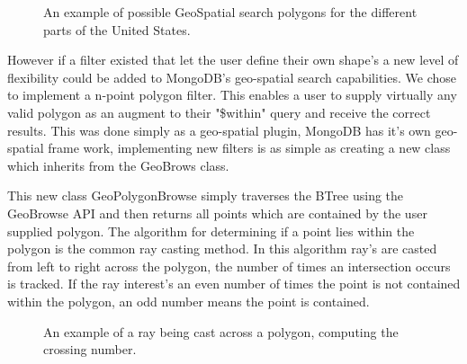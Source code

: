 \documentclass{../dependencies/acm_proc_article-sp}
\begin{document}
\begin{figure}[htb]
\centering
\setlength\fboxsep{0.5pt}
\setlength\fboxrule{0.5pt}
\caption{An example of possible GeoSpatial search polygons for the different parts of the United States.}
\end{figure}
 
However if a filter existed that let the user define their own shape's a new level of flexibility could be 
added to MongoDB's geo-spatial search capabilities. We chose to implement a n-point polygon filter.
This enables a user to supply virtually any valid polygon as an augment to their "\$within" query and receive the correct results.
This was done simply as a geo-spatial plugin, MongoDB has it's own geo-spatial frame work, implementing new filters is as 
simple as creating a new class which inherits from the GeoBrows class.



This new class GeoPolygonBrowse simply traverses the BTree using the GeoBrowse API and then returns
all points which are contained by the user supplied polygon. The algorithm for determining if a point 
lies within the polygon is the common ray casting method. In this algorithm ray's are casted from left
to right across the polygon, the number of times an intersection occurs is tracked. If the ray interest's an even number of 
times the point is not contained within the polygon, an odd number means the point is contained.
\begin{figure}[htb]
\centering
\setlength\fboxsep{0.5pt}
\setlength\fboxrule{0.5pt}
\caption{An example of a ray being cast across a polygon, computing the crossing number.}
\end{figure}
\end{document}
